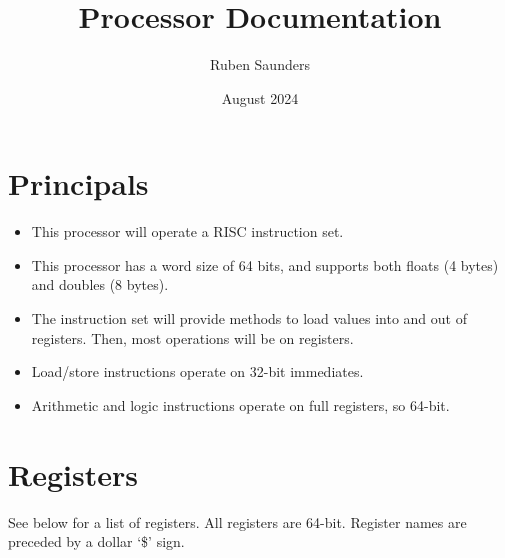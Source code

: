 \documentclass[10pt]{article}
\title{Processor Documentation}
\author{Ruben Saunders}
\date{August 2024}
\begin{document}
\maketitle

\section{Principals}

\begin{itemize}
    \item This processor will operate a RISC instruction set.
    \item This processor has a word size of 64 bits, and supports both floats (4 bytes) and doubles (8 bytes).
    \item The instruction set will provide methods to load values into and out of registers.
    Then, most operations will be on registers.
    \item Load/store instructions operate on 32-bit immediates.
    \item Arithmetic and logic instructions operate on full registers, so 64-bit.
\end{itemize}

\section{Registers}

See below for a list of registers.
All registers are 64-bit.
Register names are preceded by a dollar `\$' sign.
\end{document}
